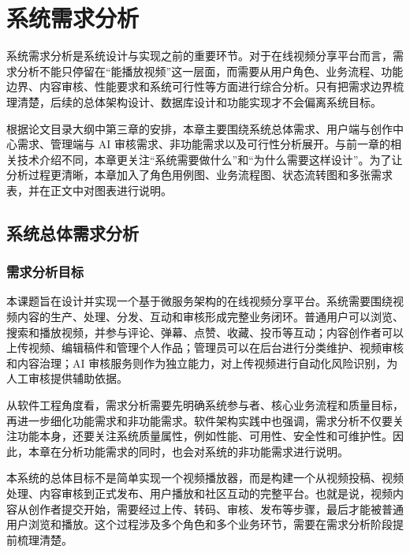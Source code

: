 
\chapter{系统需求分析}
\label{chap:requirements-analysis}

系统需求分析是系统设计与实现之前的重要环节。对于在线视频分享平台而言，需求分析不能只停留在“能播放视频”这一层面，而需要从用户角色、业务流程、功能边界、内容审核、性能要求和系统可行性等方面进行综合分析。只有把需求边界梳理清楚，后续的总体架构设计、数据库设计和功能实现才不会偏离系统目标。

根据论文目录大纲中第三章的安排，本章主要围绕系统总体需求、用户端与创作中心需求、管理端与 AI 审核需求、非功能需求以及可行性分析展开。与前一章的相关技术介绍不同，本章更关注“系统需要做什么”和“为什么需要这样设计”。为了让分析过程更清晰，本章加入了角色用例图、业务流程图、状态流转图和多张需求表，并在正文中对图表进行说明。

\section{系统总体需求分析}
\label{sec:overall-requirements}

\subsection{需求分析目标}
\label{subsec:req-analysis-goal}

本课题旨在设计并实现一个基于微服务架构的在线视频分享平台。系统需要围绕视频内容的生产、处理、分发、互动和审核形成完整业务闭环。普通用户可以浏览、搜索和播放视频，并参与评论、弹幕、点赞、收藏、投币等互动；内容创作者可以上传视频、编辑稿件和管理个人作品；管理员可以在后台进行分类维护、视频审核和内容治理；AI 审核服务则作为独立能力，对上传视频进行自动化风险识别，为人工审核提供辅助依据。

从软件工程角度看，需求分析需要先明确系统参与者、核心业务流程和质量目标，再进一步细化功能需求和非功能需求。软件架构实践中也强调，需求分析不仅要关注功能本身，还要关注系统质量属性，例如性能、可用性、安全性和可维护性\cite{bass2021softwarearchitecture}。因此，本章在分析功能需求的同时，也会对系统的非功能需求进行说明。

本系统的总体目标不是简单实现一个视频播放器，而是构建一个从视频投稿、视频处理、内容审核到正式发布、用户播放和社区互动的完整平台。也就是说，视频内容从创作者提交开始，需要经过上传、转码、审核、发布等步骤，最后才能被普通用户浏览和播放。这个过程涉及多个角色和多个业务环节，需要在需求分析阶段提前梳理清楚。

